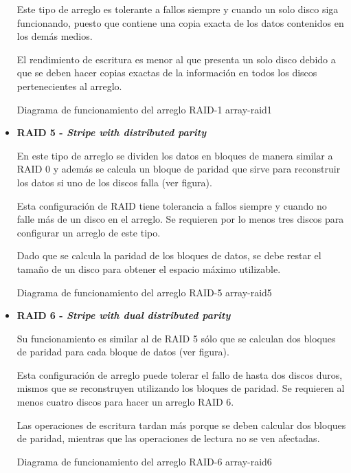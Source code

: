 \begin{itemize}
Este tipo de arreglo es tolerante a fallos siempre y cuando un solo disco siga funcionando, puesto que contiene una copia exacta de los datos contenidos en los dem\'{a}s medios.

El rendimiento de escritura es menor al que presenta un solo disco debido a que se deben hacer copias exactas de la informaci\'{o}n en todos los discos pertenecientes al arreglo.

\diagramblock
{Diagrama de funcionamiento del arreglo \textsc{RAID-1}}
{array-raid1}
{
 {
  
 }
}
\newpage
  \item \textbf{RAID 5 - \textit{Stripe with distributed parity}}

En este tipo de arreglo se dividen los datos en bloques de manera similar a \textsc{RAID} 0 y adem\'{a}s se calcula un bloque de paridad que sirve para reconstruir los datos si uno de los discos falla (ver figura).

Esta configuraci\'{o}n de \textsc{RAID} tiene tolerancia a fallos siempre y cuando no falle m\'{a}s de un disco en el arreglo. Se requieren por lo menos tres discos para configurar un arreglo de este tipo.

Dado que se calcula la paridad de los bloques de datos, se debe restar el tama\~{n}o de un disco para obtener el espacio m\'{a}ximo utilizable.

\diagramblock
{Diagrama de funcionamiento del arreglo \textsc{RAID-5}}
{array-raid5}
{
 {
  
 }
}
\newpage
  \item \textbf{RAID 6 - \textit{Stripe with \textsl{dual} distributed parity}}

Su funcionamiento es similar al de \textsc{RAID} 5 s\'{o}lo que se calculan dos bloques de paridad para cada bloque de datos (ver figura).

Esta configuraci\'{o}n de arreglo puede tolerar el fallo de hasta dos discos duros, mismos que se reconstruyen utilizando los bloques de paridad. Se requieren al menos cuatro discos para hacer un arreglo \textsc{RAID} 6.

Las operaciones de escritura tardan m\'{a}s porque se deben calcular dos bloques de paridad, mientras que las operaciones de lectura no se ven afectadas.

\diagramblock
{Diagrama de funcionamiento del arreglo \textsc{RAID-6}}
{array-raid6}
{
 {
  
 }
}

\end{itemize}

